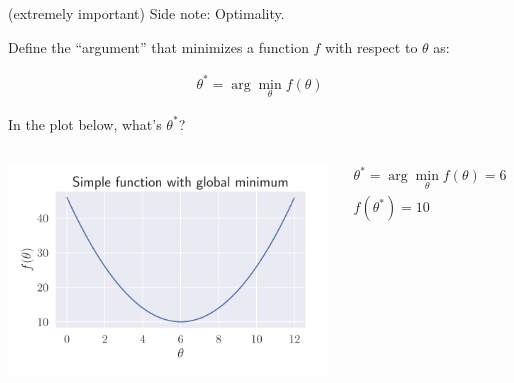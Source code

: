 \documentclass[aspectratio=169]{beamer}
\begin{document}
\begin{frame}{(extremely important) Side note: Optimality.}


Define the ``argument'' that minimizes a function $f$ with respect to $\theta$ as:

\begin{align*}
\theta^* = \arg \min_{\theta} f(\theta)
\end{align*}

In the plot below, what's $\theta^*$?

\vspace{-8mm}

\begin{columns}
\begin{center}
\includegraphics[scale=0.5]{figures/simple_min}
\end{center}

\pause
\begin{align*}
\theta^* = \arg \min_{\theta} f(\theta) = 6\\
f(\theta^*) =10
\end{align*}

\end{columns}

\end{frame}
\end{document}
